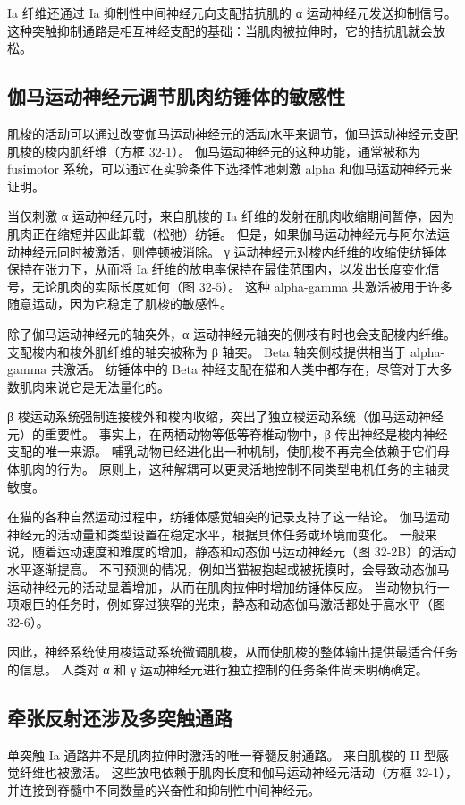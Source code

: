 Ia 纤维还通过 Ia 抑制性中间神经元向支配拮抗肌的 α 运动神经元发送抑制信号。 这种突触抑制通路是相互神经支配的基础：当肌肉被拉伸时，它的拮抗肌就会放松。

\subsection{伽马运动神经元调节肌肉纺锤体的敏感性}
肌梭的活动可以通过改变伽马运动神经元的活动水平来调节，伽马运动神经元支配肌梭的梭内肌纤维（方框 32-1）。 伽马运动神经元的这种功能，通常被称为 fusimotor 系统，可以通过在实验条件下选择性地刺激 alpha 和伽马运动神经元来证明。

当仅刺激 α 运动神经元时，来自肌梭的 Ia 纤维的发射在肌肉收缩期间暂停，因为肌肉正在缩短并因此卸载（松弛）纺锤。 但是，如果伽马运动神经元与阿尔法运动神经元同时被激活，则停顿被消除。 γ 运动神经元对梭内纤维的收缩使纺锤体保持在张力下，从而将 Ia 纤维的放电率保持在最佳范围内，以发出长度变化信号，无论肌肉的实际长度如何（图 32-5）。 这种 alpha-gamma 共激活被用于许多随意运动，因为它稳定了肌梭的敏感性。

除了伽马运动神经元的轴突外，α 运动神经元轴突的侧枝有时也会支配梭内纤维。 支配梭内和梭外肌纤维的轴突被称为 β 轴突。 Beta 轴突侧枝提供相当于 alpha-gamma 共激活。 纺锤体中的 Beta 神经支配在猫和人类中都存在，尽管对于大多数肌肉来说它是无法量化的。

β 梭运动系统强制连接梭外和梭内收缩，突出了独立梭运动系统（伽马运动神经元）的重要性。 事实上，在两栖动物等低等脊椎动物中，β 传出神经是梭内神经支配的唯一来源。 哺乳动物已经进化出一种机制，使肌梭不再完全依赖于它们母体肌肉的行为。 原则上，这种解耦可以更灵活地控制不同类型电机任务的主轴灵敏度。

在猫的各种自然运动过程中，纺锤体感觉轴突的记录支持了这一结论。 伽马运动神经元的活动量和类型设置在稳定水平，根据具体任务或环境而变化。 一般来说，随着运动速度和难度的增加，静态和动态伽马运动神经元（图 32-2B）的活动水平逐渐提高。 不可预测的情况，例如当猫被抱起或被抚摸时，会导致动态伽马运动神经元的活动显着增加，从而在肌肉拉伸时增加纺锤体反应。 当动物执行一项艰巨的任务时，例如穿过狭窄的光束，静态和动态伽马激活都处于高水平（图 32-6）。

因此，神经系统使用梭运动系统微调肌梭，从而使肌梭的整体输出提供最适合任务的信息。 人类对 α 和 γ 运动神经元进行独立控制的任务条件尚未明确确定。

\subsection{牵张反射还涉及多突触通路}
单突触 Ia 通路并不是肌肉拉伸时激活的唯一脊髓反射通路。 来自肌梭的 II 型感觉纤维也被激活。 这些放电依赖于肌肉长度和伽马运动神经元活动（方框 32-1），并连接到脊髓中不同数量的兴奋性和抑制性中间神经元。

